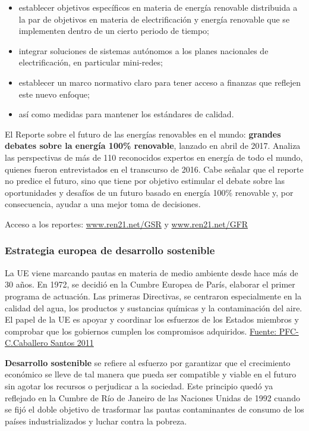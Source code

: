 \begin{itemize}
\item
  establecer objetivos específicos en materia de energía renovable
  distribuida a la par de objetivos en materia de electrificación y
  energía renovable que se implementen dentro de un cierto periodo de
  tiempo;
\item
  integrar soluciones de sistemas autónomos a los planes nacionales de
  electrificación, en particular mini-redes;
\item
  establecer un marco normativo claro para tener acceso a finanzas que
  reflejen este nuevo enfoque;
\item
  así como medidas para mantener los estándares de calidad.
\end{itemize}

El Reporte sobre el futuro de las energías renovables en el mundo:
\textbf{grandes debates sobre la energía 100\% renovable}, lanzado en
abril de 2017. Analiza las perspectivas de más de 110 reconocidos
expertos en energía de todo el mundo, quienes fueron entrevistados en el
transcurso de 2016. Cabe señalar que el reporte no predice el futuro,
sino que tiene por objetivo estimular el debate sobre las oportunidades
y desafíos de un futuro basado en energía 100\% renovable y, por
consecuencia, ayudar a una mejor toma de decisiones.

Acceso a los reportes: \url{www.ren21.net/GSR} y \url{www.ren21.net/GFR}

\subsubsection{Estrategia europea de desarrollo
sostenible}\label{header-n72}

La UE viene marcando pautas en materia de medio ambiente desde hace más
de 30 años. En 1972, se decidió en la Cumbre Europea de París, elaborar
el primer programa de actuación. Las primeras Directivas, se centraron
especialmente en la calidad del agua, los productos y sustancias
químicas y la contaminación del aire. El papel de la UE es apoyar y
coordinar los esfuerzos de los Estados miembros y comprobar que los
gobiernos cumplen los compromisos adquiridos.
\href{https://e-archivo.uc3m.es/bitstream/handle/10016/12153/PFC_Carlos_\%20Caballero_Santos.pdf?sequence=1}{Fuente:
PFC-C.Caballero Santos 2011}

\textbf{Desarrollo sostenible} se refiere al esfuerzo por garantizar que
el crecimiento económico se lleve de tal manera que pueda ser compatible
y viable en el futuro sin agotar los recursos o perjudicar a la
sociedad. Este principio quedó ya reflejado en la Cumbre de Río de
Janeiro de las Naciones Unidas de 1992 cuando se fijó el doble objetivo
de trasformar las pautas contaminantes de consumo de los países
industrializados y luchar contra la pobreza.

